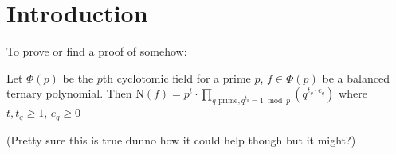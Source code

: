 \newcommand{\bbF}{\mathbb{F}}
\section{Introduction}

To prove or find a proof of somehow: 

Let $\Phi(p)$ be the $p$th cyclotomic field for a prime $p$, $f \in
\Phi(p)$ be a balanced ternary polynomial. Then $\text{N}(f)=p^t\cdot
\prod_{q\text{ prime}, q^{t_q}=1 \bmod{p}}(q^{t_q\cdot e_q})$ where
$t,t_q\geq 1$, $e_q\geq 0$ 


(Pretty sure this is true dunno how it could help though but it might?)


